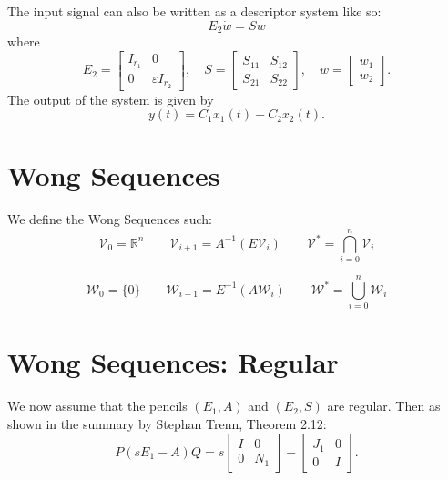 \documentclass{article}
\begin{document}
The input signal can also be written as a descriptor system like so:
\begin{equation}
    E_2 \dot{w} = S w
\end{equation}
where
\begin{equation}
    E_2 = \begin{bmatrix}
    I_{r_1} & 0 \\
    0 & \varepsilon I_{r_2}
    \end{bmatrix}, \quad
    S = \begin{bmatrix}
    S_{11} & S_{12} \\
    S_{21} & S_{22}
    \end{bmatrix}, \quad
    w = \begin{bmatrix}
    w_1 \\
    w_2
    \end{bmatrix}.
\end{equation}
The output of the system is given by
\begin{equation}
    y(t) = C_1 x_1(t) + C_2 x_2(t).
\end{equation}

\section{Wong Sequences}
We define the Wong Sequences such: 
\begin{equation}
    \mathcal{V}_0 = \mathbb{R}^n \qquad \mathcal{V}_{i+1} = A^{-1} (E \mathcal{V}_i) \qquad \mathcal{V}^* = \bigcap_{i=0}^n \mathcal{V}_i
\end{equation}

\begin{equation}
    \mathcal{W}_0 = \{0 \} \qquad \mathcal{W}_{i+1} = E^{-1} (A \mathcal{W}_i) \qquad \mathcal{W}^* = \bigcup_{i=0}^n \mathcal{W}_i
\end{equation}

\section{Wong Sequences: Regular}
We now assume that the pencils $(E_1, A)$ and $(E_2, S)$ are regular. 
Then as shown in the summary by Stephan Trenn, Theorem 2.12: 
\begin{equation}
    P(sE_1-A)Q = s
    \begin{bmatrix}
        I & 0 \\
        0 & N_1
    \end{bmatrix}
    -
    \begin{bmatrix}
        J_1 & 0 \\ 
        0 & I
    \end{bmatrix}.
\end{equation}
\end{document}

